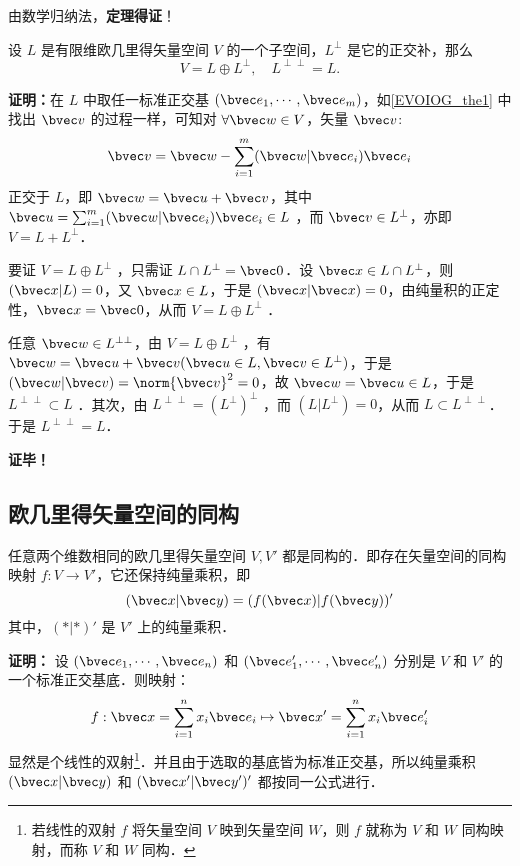 由数学归纳法，\textbf{定理得证}！

\begin{theorem}{}
设 $L$ 是有限维欧几里得矢量空间 $V$ 的一个子空间，$L^{\perp}$ 是它的正交补，那么
\begin{equation}
V=L\oplus L^{\perp},\quad L^{\perp\perp}=L.
\end{equation}
\end{theorem}
\textbf{证明：}在 $L$ 中取任一标准正交基 $(\bvec e_1,\cdots,\bvec e_m)$，如\autoref{EVOIOG_the1} 中找出 $\bvec v$ 的过程一样，可知对 $\forall \bvec w\in V$，矢量 $\bvec v$:
\begin{equation}
\bvec v=\bvec w-\sum_{i=1}^m(\bvec w|\bvec e_i)\bvec e_i
\end{equation}
正交于 $L$，即 $\bvec w=\bvec u+\bvec v$，其中 $\bvec u=\sum_{i=1}^m(\bvec w|\bvec e_i)\bvec e_i\in L$ ，而 $\bvec v\in L^{\perp}$，亦即 $V=L+L^{\perp}$．

要证 $V=L\oplus L^{\perp}$ ，只需证 $L\cap L^{\perp}=\bvec 0$．设 $\bvec x\in L\cap L^{\perp}$，则 $(\bvec x|L)=0$，又 $\bvec x\in L$，于是 $(\bvec x|\bvec x)=0$，由纯量积的正定性，$\bvec x=\bvec 0$，从而 $V=L\oplus L^{\perp}$ ．

任意 $\bvec w\in L^{\perp\perp}$，由 $V=L\oplus L^{\perp}$ ，有 $\bvec w=\bvec u+\bvec v(\bvec u\in L,\bvec v\in L^{\perp})$，于是 $(\bvec w|\bvec v)=\norm{\bvec v}^2=0$，故 $\bvec w=\bvec u\in L$，于是 $L^{\perp\perp}\subset L$ ．其次，由 $L^{\perp\perp}=(L^{\perp})^{\perp}$ ，而 $(L|L^{\perp})=0$，从而 $L\subset L^{\perp\perp}$．于是 $L^{\perp\perp}=L$．

\textbf{证毕！}
\subsection{欧几里得矢量空间的同构}
\begin{theorem}{}
任意两个维数相同的欧几里得矢量空间 $V,V'$ 都是同构的．即存在矢量空间的同构映射 $f:V\rightarrow V'$，它还保持纯量乘积，即
\begin{equation}
(\bvec x|\bvec y)=(f(\bvec x)|f(\bvec y))'
\end{equation}
其中，$(*|*)'$ 是 $V'$ 上的纯量乘积．
\end{theorem}
\textbf{证明：} 设 $(\bvec e_1,\cdots,\bvec e_n)$ 和 $(\bvec e'_1,\cdots,\bvec e'_n)$ 分别是 $V$ 和 $V'$ 的一个标准正交基底．则映射：
\begin{equation}
f:\bvec x=\sum_{i=1}^{n}x_i\bvec e_i\mapsto\bvec x'=\sum_{i=1}^{n}x_i\bvec e'_i
\end{equation}
显然是个线性的双射\footnote{若线性的双射 $f$ 将矢量空间 $V$ 映到矢量空间 $W$，则 $f$ 就称为 $V$ 和 $W$ 同构映射，而称 $V$ 和 $W$ 同构．}．并且由于选取的基底皆为标准正交基，所以纯量乘积 $(\bvec x|\bvec y)$ 和 $(\bvec x'|\bvec y')'$ 都按同一公式进行．

